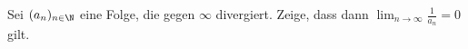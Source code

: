 \begin{exercise}
  Sei $(a_n)_{n \in \N}$ eine Folge, die gegen $\infty$ divergiert. Zeige, dass
  dann $\lim_{n \to \infty} \frac{1}{a_n} = 0$ gilt.
\end{exercise}
